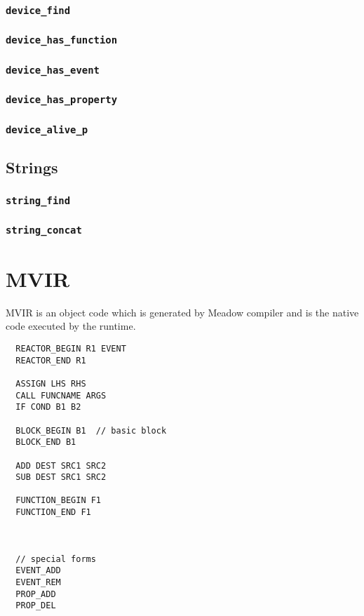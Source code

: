 \documentclass{note}\usepackage{mathptm,mydef}
\begin{document}
\subsubsection{\small\textcolor{red2}{\texttt{device\_find}}}

\subsubsection{\small\textcolor{red2}{\texttt{device\_has\_function}}}

\subsubsection{\small\textcolor{red2}{\texttt{device\_has\_event}}}

\subsubsection{\small\textcolor{red2}{\texttt{device\_has\_property}}}

\subsubsection{\small\textcolor{red2}{\texttt{device\_alive\_p}}}


\subsection{Strings}
\subsubsection{\small\textcolor{red2}{\texttt{string\_find}}}
\subsubsection{\small\textcolor{red2}{\texttt{string\_concat}}}



\section{MVIR}
MVIR is an object code which is generated by Meadow compiler and is the native
code executed by the runtime.

\begin{verbatim}
  REACTOR_BEGIN R1 EVENT
  REACTOR_END R1

  ASSIGN LHS RHS
  CALL FUNCNAME ARGS
  IF COND B1 B2

  BLOCK_BEGIN B1  // basic block
  BLOCK_END B1

  ADD DEST SRC1 SRC2
  SUB DEST SRC1 SRC2

  FUNCTION_BEGIN F1 
  FUNCTION_END F1

  
  
  // special forms
  EVENT_ADD
  EVENT_REM
  PROP_ADD
  PROP_DEL
\end{verbatim}
\end{document}
